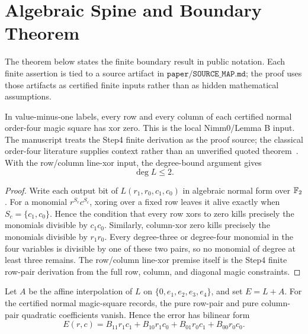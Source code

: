 \section{Algebraic Spine and Boundary Theorem}
\label{sec:theorem}

The theorem below states the finite boundary result in public notation.
Each finite assertion is tied to a source artifact in
\(\texttt{paper/SOURCE\_MAP.md}\); the proof uses those artifacts as certified
finite inputs rather than as hidden mathematical assumptions.

\begin{certprop}
\label{cert:line-xor-degree}
In value-minus-one labels, every row and every column of each certified normal
order-four magic square has xor zero.  This is the local Nimm0/Lemma B input.
The manuscript treats the Step4 finite derivation as the proof source; the
classical order-four literature supplies context rather than an unverified
quoted theorem~\cite{ollerenshawBondi,wardMagicVectorSpaces}.  With the
row/column line-xor input, the degree-bound argument gives
\[
  \deg L\le 2.
\]
\end{certprop}

\begin{proof}
Write each output bit of \(L(r_1,r_0,c_1,c_0)\) in algebraic normal form over
\(\mathbb F_2\).  For a monomial \(r^{S_r}c^{S_c}\), xoring over a fixed row leaves it
alive exactly when \(S_c=\{c_1,c_0\}\).  Hence the condition that every row xors
to zero kills precisely the monomials divisible by \(c_1c_0\).  Similarly,
column-xor zero kills precisely the monomials divisible by \(r_1r_0\).  Every
degree-three or degree-four monomial in the four variables is divisible by one
of these two pairs, so no monomial of degree at least three remains.  The
row/column line-xor premise itself is the Step4 finite row-pair derivation from
the full row, column, and diagonal magic constraints.
\end{proof}

\begin{lemma}
\label{lem:quadratic-error-form}
Let \(A\) be the affine interpolation of \(L\) on
\(\{0,e_1,e_2,e_3,e_4\}\), and set \(E=L+A\).  For the certified normal
magic-square records, the pure row-pair and pure column-pair quadratic
coefficients vanish.  Hence the error has bilinear form
\[
  E(r,c)=B_{11}r_1c_1+B_{10}r_1c_0+B_{01}r_0c_1+B_{00}r_0c_0.
\]
\end{lemma}

